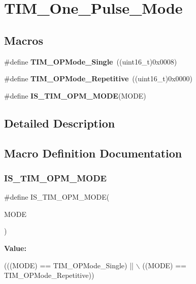 \section{T\+I\+M\+\_\+\+One\+\_\+\+Pulse\+\_\+\+Mode}
\label{group__TIM__One__Pulse__Mode}
\subsection*{Macros}
\begin{DoxyCompactItemize}
\item 
\#define \textbf{ T\+I\+M\+\_\+\+O\+P\+Mode\+\_\+\+Single}~((uint16\+\_\+t)0x0008)
\item 
\#define \textbf{ T\+I\+M\+\_\+\+O\+P\+Mode\+\_\+\+Repetitive}~((uint16\+\_\+t)0x0000)
\item 
\#define \textbf{ I\+S\+\_\+\+T\+I\+M\+\_\+\+O\+P\+M\+\_\+\+M\+O\+DE}(M\+O\+DE)
\end{DoxyCompactItemize}


\subsection{Detailed Description}


\subsection{Macro Definition Documentation}
\mbox{\label{group__TIM__One__Pulse__Mode_ga3f4a4305b4feacb4322eb4a358e54637}} 
\subsubsection{I\+S\+\_\+\+T\+I\+M\+\_\+\+O\+P\+M\+\_\+\+M\+O\+DE}
{\footnotesize\ttfamily \#define I\+S\+\_\+\+T\+I\+M\+\_\+\+O\+P\+M\+\_\+\+M\+O\+DE(\begin{DoxyParamCaption}\item[{}]{M\+O\+DE }\end{DoxyParamCaption})}

{\bfseries Value\+:}
\begin{DoxyCode}
(((MODE) == TIM_OPMode_Single) || \(\backslash\)
                               ((MODE) == TIM_OPMode_Repetitive))
\end{DoxyCode}


